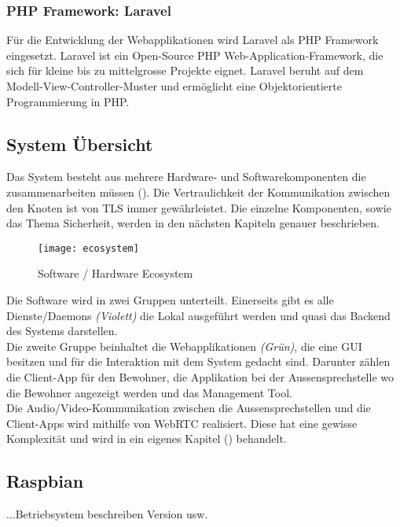 \subsubsection{PHP Framework: Laravel}
Für die Entwicklung der Webapplikationen wird Laravel als PHP Framework eingesetzt. Laravel ist ein Open-Source PHP Web-Application-Framework, die sich für kleine bis zu mittelgrosse Projekte eignet. Laravel beruht auf dem Modell-View-Controller-Muster und ermöglicht eine Objektorientierte Programmierung in PHP.

\subsection{System Übersicht}
Das System besteht aus mehrere Hardware- und Softwarekomponenten die zusammenarbeiten müssen (). Die  Vertraulichkeit der Kommunikation zwischen den Knoten ist von TLS immer gewährleistet. Die einzelne Komponenten, sowie das Thema Sicherheit, werden in den nächsten Kapiteln genauer beschrieben.

\begin{figure}[htb!]
	\begin{center}
		\texttt{[image: ecosystem]}
		\caption[Software / Hardware Ecosystem]{Software / Hardware Ecosystem}
		\label{fig:echosystem}
	\end{center}
\end{figure}

Die Software wird in zwei Gruppen unterteilt. Einerseits gibt es alle Dienste/Daemons \textit{(Violett)} die Lokal ausgeführt werden und quasi das Backend des Systems darstellen.
\\
Die zweite Gruppe beinhaltet die Webapplikationen \textit{(Grün)}, die eine GUI besitzen und für die Interaktion mit dem System gedacht sind. Darunter zählen die Client-App für den Bewohner, die Applikation bei der Aussensprechstelle wo die Bewohner angezeigt werden und das Management Tool.
\\
Die Audio/Video-Kommunikation zwischen die Aussensprechstellen und die Client-Apps wird mithilfe von WebRTC realisiert. Diese hat eine gewisse Komplexität und wird in ein eigenes Kapitel () behandelt.

\subsection{Raspbian}
\label{kap:raspbian}
...Betriebsystem beschreiben Version usw.

